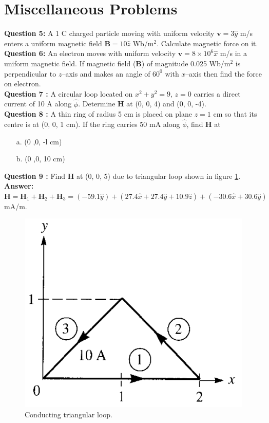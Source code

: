 \documentclass[12pt,a4paper]{article}
\begin{document}
\section{Miscellaneous Problems}
\noindent\textbf{Question 5:} A 1 C charged particle moving with uniform velocity $\textbf{v}=3\hat y$ m/s enters a uniform magnetic field $\textbf{B}=10\hat z$ Wb/m$^2$. Calculate magnetic force on it.\\[0.2cm]
\noindent\textbf{Question 6:} An electron moves with uniform velocity $\textbf{v}=8\times 10^6\hat x$ m/s in a uniform magnetic field. If magnetic field (\textbf{B}) of magnitude 0.025 Wb/m$^2$ is perpendicular to $z$--axis and makes an angle of $60^0$ with $x$--axis then find the force on electron.\\[0.2cm]
\noindent\textbf{Question 7 \cite[Example 7.3, page 270]{Sadiku}:} A circular loop located on $x^2+y^2=9$, $z=0$ carries a direct current of 10 A along $\hat\phi$. Determine \textbf{H} at (0, 0, 4) and (0, 0, -4).\\[0.2cm]
\noindent\textbf{Question 8 \cite[PE 7.3, page 271]{Sadiku}:} A thin ring of radius 5 cm is placed on plane $z=1$ cm so that its centre is at (0, 0, 1 cm). If the ring carries 50 mA along $\hat\phi$, find \textbf{H} at
\begin{itemize}
\item[a.] (0 ,0, -l cm)
\item[b.] (0 ,0, 10 cm)
\end{itemize}
\noindent\textbf{Question 9 \cite[Example 7.1, page 266]{Sadiku}:} Find \textbf{H} at (0, 0, 5) due to triangular loop shown in figure \ref{Conducting-triangular-loop}.\\
\textbf{Answer: }$\textbf{H}=\textbf{H}_1+\textbf{H}_2+\textbf{H}_3=(-59.1\hat y)+(27.4\hat x+27.4\hat y+10.9\hat z)+(-30.6\hat x+30.6\hat y)$ mA/m.
\begin{figure}[H]
\centering
\includegraphics[scale=0.45]{Figure7-6aS.png}
\caption{Conducting triangular loop.}
\label{Conducting-triangular-loop}
\end{figure}
\end{document}
